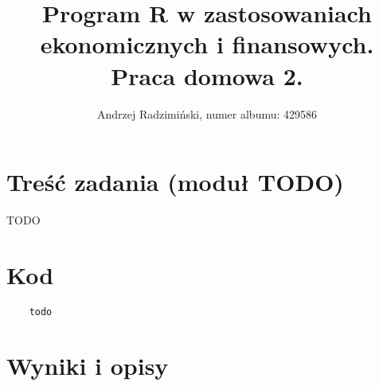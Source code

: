 

\title{Program R w zastosowaniach ekonomicznych i finansowych. Praca domowa 2.}
\author{Andrzej Radzimiński, numer albumu: 429586}
\date{}



\renewcommand{\contentsname}{Spis treści}

\setlength{\parindent}{0pt}
\noindent

\maketitle



\section*{Treść zadania (moduł TODO)}

TODO

\newpage

\section*{Kod}

\begin{lstlisting}
    todo    
\end{lstlisting}

\section*{Wyniki i opisy}




